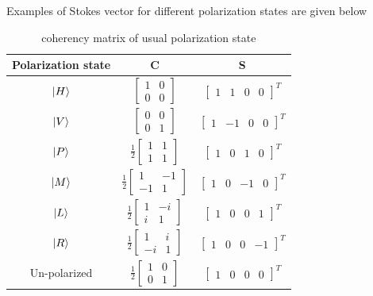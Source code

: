 \documentclass[11pt,a4paper]{article}
\numberwithin{equation}{section}
\begin{document}
Examples of Stokes vector for different polarization states are given below
\begin{table}[H]
	\centering
	\begin{tabular}{ c c c } 
		\hline
		\hline
		Polarization state &  \textbf{C} & \textbf{S}\\
		\hline
		$\ket{H}$ & $\begin{bmatrix}1&0\\0&0\end{bmatrix}$ & $\begin{bmatrix}1&1&0&0\end{bmatrix}^T$\\ \hline
		$\ket{V}$ & $\begin{bmatrix}0&0\\0&1\end{bmatrix}$ & $\begin{bmatrix}1&-1&0&0\end{bmatrix}^T$\\ \hline
		$\ket{P}$ & $\frac{1}{2}\begin{bmatrix}1&1\\1&1\end{bmatrix}$ & $\begin{bmatrix}1&0&1&0\end{bmatrix}^T$\\ \hline
		$\ket{M}$ & $\frac{1}{2}\begin{bmatrix}1&-1\\-1&1\end{bmatrix}$ & $\begin{bmatrix}1&0&-1&0\end{bmatrix}^T$\\ \hline
		$\ket{L}$ & $\frac{1}{2}\begin{bmatrix}1&-i\\i&1\end{bmatrix}$ & $\begin{bmatrix}1&0&0&1\end{bmatrix}^T$\\ \hline
		$\ket{R}$ & $\frac{1}{2}\begin{bmatrix}1&i\\-i&1\end{bmatrix}$ & $\begin{bmatrix}1&0&0&-1\end{bmatrix}^T$\\ \hline
		Un-polarized &  $\frac{1}{2}\begin{bmatrix}1&0\\0&1\end{bmatrix}$ & $\begin{bmatrix}1&0&0&0\end{bmatrix}^T$\\
		\hline
		\hline
	\end{tabular}
	\caption{coherency matrix of usual polarization state}
	\label{table:4}
\end{table}
\end{document}
